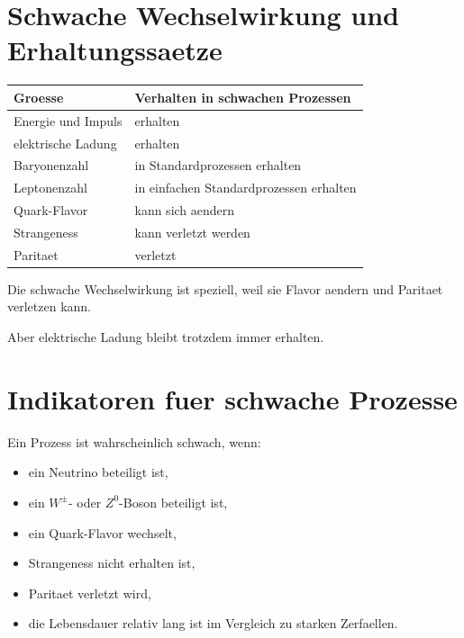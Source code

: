 \section{Schwache Wechselwirkung und Erhaltungssaetze}

\begin{center}
\begin{tabular}{|p{5.0cm}|p{7.5cm}|}
\hline
Groesse & Verhalten in schwachen Prozessen \\
\hline
Energie und Impuls & erhalten \\
\hline
elektrische Ladung & erhalten \\
\hline
Baryonenzahl & in Standardprozessen erhalten \\
\hline
Leptonenzahl & in einfachen Standardprozessen erhalten \\
\hline
Quark-Flavor & kann sich aendern \\
\hline
Strangeness & kann verletzt werden \\
\hline
Paritaet & verletzt \\
\hline
\end{tabular}
\end{center}

\begin{examtipbox}
Die schwache Wechselwirkung ist speziell, weil sie Flavor aendern und Paritaet
verletzen kann.

Aber elektrische Ladung bleibt trotzdem immer erhalten.
\end{examtipbox}

\section{Indikatoren fuer schwache Prozesse}

\begin{conceptbox}
Ein Prozess ist wahrscheinlich schwach, wenn:
\begin{itemize}
    \item ein Neutrino beteiligt ist,
    \item ein $W^\pm$- oder $Z^0$-Boson beteiligt ist,
    \item ein Quark-Flavor wechselt,
    \item Strangeness nicht erhalten ist,
    \item Paritaet verletzt wird,
    \item die Lebensdauer relativ lang ist im Vergleich zu starken Zerfaellen.
\end{itemize}
\end{conceptbox}


